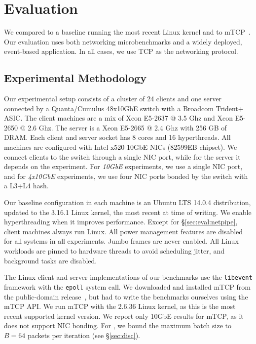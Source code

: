 
\section{Evaluation}
\label{sec:eval}


We compared \ix to a baseline running the most recent Linux kernel and
to mTCP~\cite{jeong2014mtcp}. Our evaluation uses both networking
microbenchmarks and a widely deployed, event-based application. In all
cases, we use TCP as the networking protocol.

\subsection{Experimental Methodology}
\label{sec:eval:setup}

 

Our experimental setup consists of a cluster of 24 clients and one
server connected by a Quanta/Cumulus 48x10GbE switch with a Broadcom
Trident+ ASIC.  The client machines are a mix of Xeon E5-2637 @ 3.5
Ghz and Xeon E5-2650 @ 2.6 Ghz. The server is a Xeon E5-2665 @ 2.4 Ghz
with 256 GB of DRAM.  Each client and server socket has 8 cores and 16
hyperthreads. All machines are configured with Intel x520 10GbE NICs
(82599EB chipset). We connect clients to the switch through a single
NIC port, while for the server it depends on the experiment. For
\emph{10GbE} experiments, we use a single NIC port, and for
\emph{4x10GbE} experiments, we use four NIC ports bonded by the switch
with a L3+L4 hash.

Our baseline configuration in each
machine is an Ubuntu LTS 14.0.4 distribution, updated to the 3.16.1 Linux kernel, the most
recent at time of writing.
We enable hyperthreading when it improves performance. Except for
\S\ref{sec:eval:netpipe}, client machines always run Linux. All power
management features are disabled for all systems in all
experiments. Jumbo frames are never enabled. All Linux workloads
are pinned to hardware threads to avoid scheduling jitter, and
background tasks are disabled.


The Linux client and server implementations of our benchmarks use the
\texttt{libevent} framework with the \texttt{epoll} system call.  We
downloaded and installed mTCP from the public-domain
release~\cite{url:mtcp}, but had to write the benchmarks ourselves
using the mTCP API.  We run mTCP with the 2.6.36 Linux kernel, as this
is the most recent supported kernel version.  We report only 10GbE
results for mTCP, as it does not support NIC bonding. For \ix, we
bound the maximum batch size to $B=64$ packets per iteration (see
\S\ref{sec:disc}).



